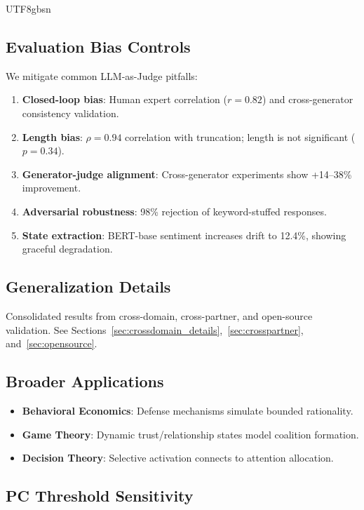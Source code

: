 \documentclass[11pt]{article}
\begin{document}
\begin{CJK*}{UTF8}{gbsn}
\subsection{Evaluation Bias Controls}
\label{sec:eval_bias_controls}

We mitigate common LLM-as-Judge pitfalls:
\begin{enumerate}
    \item \textbf{Closed-loop bias}: Human expert correlation ($r = 0.82$) and cross-generator consistency validation.
    \item \textbf{Length bias}: $\rho = 0.94$ correlation with truncation; length is not significant ($p = 0.34$).
    \item \textbf{Generator-judge alignment}: Cross-generator experiments show +14--38\% improvement.
    \item \textbf{Adversarial robustness}: 98\% rejection of keyword-stuffed responses.
    \item \textbf{State extraction}: BERT-base sentiment increases drift to 12.4\%, showing graceful degradation.
\end{enumerate}

\subsection{Generalization Details}
\label{sec:generalization_details}

Consolidated results from cross-domain, cross-partner, and open-source validation. See Sections~\ref{sec:crossdomain_details},~\ref{sec:crosspartner}, and~\ref{sec:opensource}.

\subsection{Broader Applications}
\label{sec:broader}

\begin{itemize}
    \item \textbf{Behavioral Economics}: Defense mechanisms simulate bounded rationality.
    \item \textbf{Game Theory}: Dynamic trust/relationship states model coalition formation.
    \item \textbf{Decision Theory}: Selective activation connects to attention allocation.
\end{itemize}

\subsection{PC Threshold Sensitivity}
\label{sec:threshold_sensitivity}


\end{CJK*}
\end{document}
